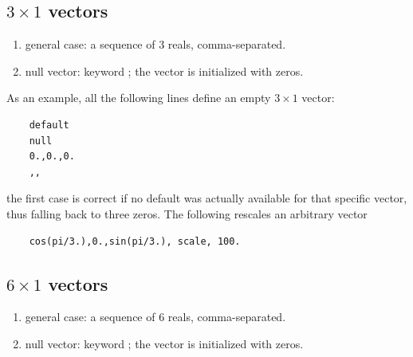 \subsection{$3 \times 1$ vectors}
\begin{enumerate}
    \item general case: a sequence of 3 reals, comma-separated.
    \item null vector: keyword ; the vector is initialized
	with zeros.
\end{enumerate}
As an example, all the following lines define an empty $3 \times 1$ vector:
\begin{verbatim}
    default
    null
    0.,0.,0.
    ,,
\end{verbatim}
the first case is correct if no default was actually available
for that specific vector, thus falling back to three zeros.
The following rescales an arbitrary vector
\begin{verbatim}
    cos(pi/3.),0.,sin(pi/3.), scale, 100.
\end{verbatim}

\subsection{$6 \times 1$ vectors}
\begin{enumerate}
    \item general case: a sequence of 6 reals, comma-separated.
    \item null vector: keyword ; the vector is initialized 
    with zeros.	
\end{enumerate}
